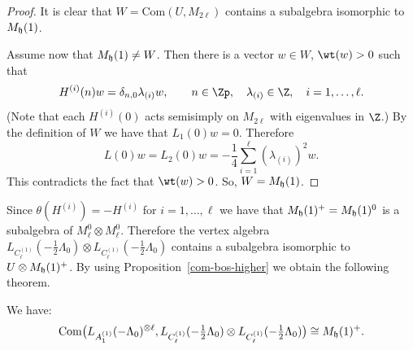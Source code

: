 \begin{proof}
It is clear that
 $W= \mbox{Com} ( U, M_{2\ell})$ contains a subalgebra isomorphic to $M_{\frak h}
(1)$.

Assume now that $M_{\frak h} (1) \ne W$. Then there is a vector
$ w \in W$, ${\wt} (w) > 0$ such that
\[ H ^{(i)}(n) w =  \delta_{n,0} \lambda _{(i)} w, \qquad n \in {\Zp},
\quad \lambda _{(i)} \in {\Z}, \quad i = 1, \dots, \ell.
\]
(Note that each  $H^{(i)}(0)$ acts semisimply on $M_{2\ell}$ with
eigenvalues in ${\Z}$.)
By the def\/inition of $W$ we have that $L_1 (0) w = 0$. Therefore
\[ L(0) w = L_2(0) w = - \frac{1}{4} \sum_{i = 1 } ^{\ell} (\lambda
_{(i)})  ^2 w. \] This contradicts the fact that $\wt (w) > 0$. So,
$W= M_{\frak h} (1)$.
\end{proof}


Since $\theta (H^{(i)}) = -H^{(i)}$ for $i=1, \dots, \ell$ we have
that $M_{\frak h} (1)^+ =M_{\frak h}(1) ^0$ is a subalgebra of
$M_{\ell} ^0 \otimes M_{\ell} ^0$.
 Therefore the  vertex algebra $L_{C_{\ell} ^{(1)}}(-\tfrac{1}{2}\Lambda_0) \otimes L_{C_{\ell} ^{(1)}}(-\tfrac{1}{2}\Lambda_0)$ contains a subalgebra isomorphic
to $U \otimes M_{\frak h} (1) ^+$. By using Proposition~\ref{com-bos-higher} we obtain the following theorem.

\begin{theorem} \label{coset-bos-r-higher}We have:
\[ {\rm Com} \big( L_{A_1 ^{(1)}}(- \Lambda_0) ^{\otimes
\ell},L_{C_{\ell} ^{(1)}}(-\tfrac{1}{2}\Lambda_0) \otimes
L_{C_{\ell} ^{(1)}}(-\tfrac{1}{2}\Lambda_0) \big) \cong M_{\frak h} (1)
^+.\]
\end{theorem}
